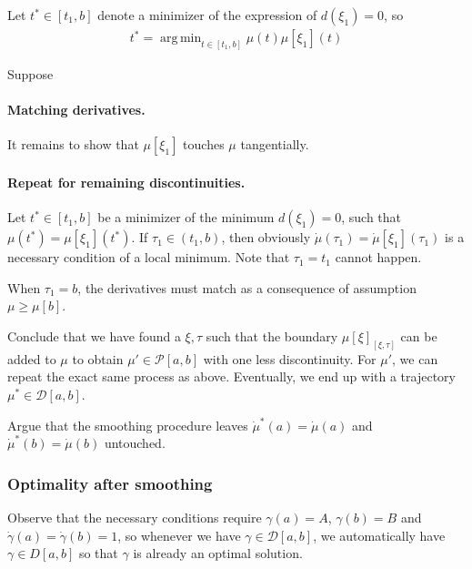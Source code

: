 \documentclass[a4paper]{article}
\theoremstyle{definition}
\theoremstyle{plain}
\DeclareMathOperator*{\argmin}{arg\,min}
\begin{document}
Let $t^{*} \in [t_{1}, b]$ denote a minimizer of the expression of
$d(\xi_{1}) = 0$, so
\begin{align}
  t^{*} = \argmin_{t \in [t_{1},b]} \mu(t)  \mu[\xi_{1}](t)
\end{align}

Suppose


\paragraph{Matching derivatives.}
It remains to show that $\mu[\xi_{1}]$ touches $\mu$ tangentially.

\paragraph{Repeat for remaining discontinuities.}

\begin{outline}

  \1 Let $t^{*} \in [t_{1}, b]$ be a minimizer of the minimum $d(\xi_{1}) = 0$,
  such that $\mu(t^{*}) = \mu[\xi_{1}](t^{*})$.
  If $\tau_{1} \in (t_{1}, b)$, then obviously
  $\dot{\mu}(\tau_{1}) = \dot{\mu}[\xi_{1}](\tau_{1})$ is a necessary condition
  of a local minimum. Note that $\tau_{1}=t_{1}$ cannot happen.

  \1 When $\tau_{1} = b$, the derivatives must match as a consequence of
  assumption $\mu \geq \mu[b]$.

  \1 Conclude that we have found a $\xi, \tau$ such that the boundary
  $\mu[\xi]_{[\xi,\tau]}$ can be added to $\mu$ to obtain
  $\mu' \in \mathcal{P}[a,b]$ with one less discontinuity. For $\mu'$, we can
  repeat the exact same process as above. Eventually, we end up with a
  trajectory $\mu^{*} \in \mathcal{D}[a,b]$.

  \1 Argue that the smoothing procedure leaves $\dot{\mu}^{*}(a) = \dot{\mu}(a)$
  and $\dot{\mu}^{*}(b) = \dot{\mu}(b)$ untouched.
\end{outline}


\subsubsection{Optimality after smoothing}


{\color{Navy} Observe that the necessary conditions require $\gamma(a) = A$,
  $\gamma(b) = B$ and $\dot{\gamma}(a) = \dot{\gamma}(b) = 1$, so whenever we
  have $\gamma \in \mathcal{D}[a, b]$, we automatically have $\gamma \in D[a,b]$
  so that $\gamma$ is already an optimal solution. }
\end{document}
